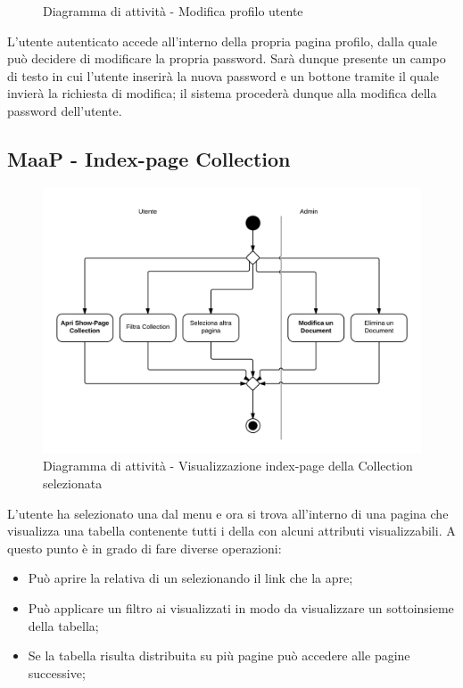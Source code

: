 \begin{figure}[H]
\caption{Diagramma di attività - Modifica profilo utente}
\end{figure}

L'utente autenticato accede all'interno della propria pagina profilo, dalla quale può decidere di modificare la propria password. Sarà dunque presente un campo di testo in cui l'utente inserirà la nuova password e un bottone tramite il quale invierà la richiesta di modifica; il sistema  procederà dunque alla modifica della password dell'utente.

\subsection{MaaP - Index-page Collection}

\begin{figure}[H]
\centering
\includegraphics[scale=0.2]{uml/MaaP - Index-page.png}
\caption{Diagramma di attività - Visualizzazione index-page della Collection selezionata}
\end{figure}

L'utente ha selezionato una  dal menu e ora si trova all'interno di una pagina che visualizza una tabella contenente tutti i  della  con alcuni attributi visualizzabili. A questo punto è in grado di fare diverse operazioni:

\begin{itemize}

	\item Può aprire la relativa  di un  selezionando il link che la apre;
	\item Può applicare un filtro ai  visualizzati in modo da visualizzare un sottoinsieme della tabella;
	\item Se la tabella risulta distribuita su più pagine può accedere alle pagine successive;

\end{itemize}

